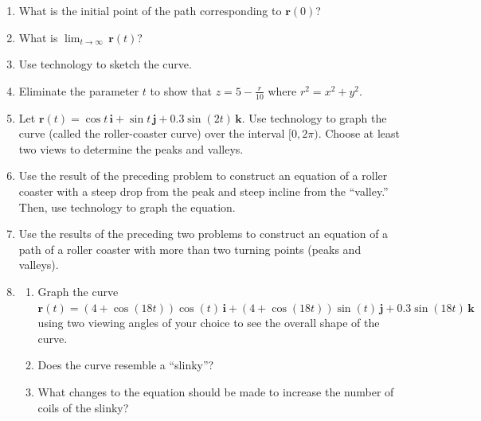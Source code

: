 \documentclass{exercises}
\begin{document}
\begin{enumerate}[resume]
\item What is the initial point of the path corresponding to $\mathbf{r}(0)$?
\item What is $\lim_{t\to \infty}\,\mathbf{r}(t)$?
\item \techrequired Use technology to sketch the curve.
\item Eliminate the parameter $t$ to show that $z=5-\frac{r}{10}$ where $r^{2}=x^{2}+y^{2}$.
\item \techrequired Let $\mathbf{r}(t)=\cos t\,\mathbf{i}+\sin t\,\mathbf{j}+0.3\sin(2t)\,\mathbf{k}$. Use technology to graph the curve (called the roller-coaster curve) over the interval $[0,2\pi)$. Choose at least two views to determine the peaks and valleys.
\item \techrequired Use the result of the preceding problem to construct an equation of a roller coaster with a steep drop from the peak and steep incline from the ``valley.'' Then, use technology to graph the equation.
\item Use the results of the preceding two problems to construct an equation of a path of a roller coaster with more than two turning points (peaks and valleys).
\item
\begin{enumerate}[label=(\alph*)]
  \item Graph the curve $\mathbf{r}(t)=(4+\cos(18t))\cos(t)\,\mathbf{i}+(4+\cos(18t))\sin(t)\,\mathbf{j}+0.3\sin(18t)\,\mathbf{k}$ using two viewing angles of your choice to see the overall shape of the curve.
  \item Does the curve resemble a ``slinky''?
  \item What changes to the equation should be made to increase the number of coils of the slinky?
\end{enumerate}
\end{enumerate}
\end{document}

